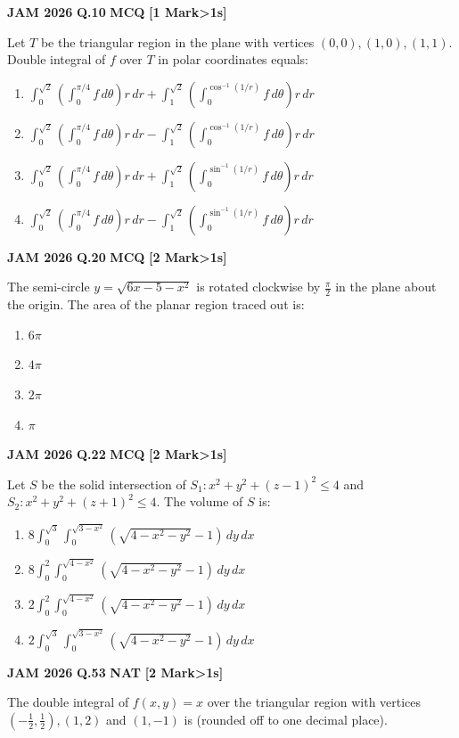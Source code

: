 \documentclass[11pt,a4paper]{article}
\newcommand{\pyqheader}[4]{%
    \noindent\begin{tcolorbox}[
        colback=badgebg,
        colframe=secondary,
        arc=2mm,
        boxrule=0.6pt,
        top=1.5mm,bottom=1.5mm,left=2mm,right=2mm
    ]
        \textbf{\textcolor{primary}{JAM #1}} \hfill \textbf{Q.#2} \hfill \textsc{\textbf{#3}} \hfill \textbf{[#4 Mark\ifnum#4>1s\fi]}
    \end{tcolorbox}\vspace{-1mm}
}
\begin{document}
\pyqheader{2026}{10}{MCQ}{1}
Let $T$ be the triangular region in the plane with vertices $(0,0), (1,0), (1,1)$. Double integral of $f$ over $T$ in polar coordinates equals:
\begin{enumerate}[label=(\Alph*)]
    \item $\int_{0}^{\sqrt{2}}\left(\int_{0}^{\pi/4}f\,d\theta\right)r\,dr + \int_{1}^{\sqrt{2}}\left(\int_{0}^{\cos^{-1}(1/r)}f\,d\theta\right)r\,dr$
    \item $\int_{0}^{\sqrt{2}}\left(\int_{0}^{\pi/4}f\,d\theta\right)r\,dr - \int_{1}^{\sqrt{2}}\left(\int_{0}^{\cos^{-1}(1/r)}f\,d\theta\right)r\,dr$
    \item $\int_{0}^{\sqrt{2}}\left(\int_{0}^{\pi/4}f\,d\theta\right)r\,dr + \int_{1}^{\sqrt{2}}\left(\int_{0}^{\sin^{-1}(1/r)}f\,d\theta\right)r\,dr$
    \item $\int_{0}^{\sqrt{2}}\left(\int_{0}^{\pi/4}f\,d\theta\right)r\,dr - \int_{1}^{\sqrt{2}}\left(\int_{0}^{\sin^{-1}(1/r)}f\,d\theta\right)r\,dr$
\end{enumerate}

\pyqheader{2026}{20}{MCQ}{2}
The semi-circle $y=\sqrt{6x-5-x^{2}}$ is rotated clockwise by $\frac{\pi}{2}$ in the plane about the origin. The area of the planar region traced out is:
\begin{enumerate}[label=(\Alph*)]
    \item $6\pi$
    \item $4\pi$
    \item $2\pi$
    \item $\pi$
\end{enumerate}

\pyqheader{2026}{22}{MCQ}{2}
Let $S$ be the solid intersection of $S_{1}: x^{2}+y^{2}+(z-1)^{2}\le 4$ and $S_{2}: x^{2}+y^{2}+(z+1)^{2}\le 4$. The volume of $S$ is:
\begin{enumerate}[label=(\Alph*)]
    \item $8\int_{0}^{\sqrt{3}}\int_{0}^{\sqrt{3-x^{2}}}(\sqrt{4-x^{2}-y^{2}}-1)\,dy\,dx$
    \item $8\int_{0}^{2}\int_{0}^{\sqrt{4-x^{2}}}(\sqrt{4-x^{2}-y^{2}}-1)\,dy\,dx$
    \item $2\int_{0}^{2}\int_{0}^{\sqrt{4-x^{2}}}(\sqrt{4-x^{2}-y^{2}}-1)\,dy\,dx$
    \item $2\int_{0}^{\sqrt{3}}\int_{0}^{\sqrt{3-x^{2}}}(\sqrt{4-x^{2}-y^{2}}-1)\,dy\,dx$
\end{enumerate}

\pyqheader{2026}{53}{NAT}{2}
The double integral of $f(x,y)=x$ over the triangular region with vertices $(-\frac{1}{2},\frac{1}{2}), (1,2)$ and $(1,-1)$ is \underline{\hspace{1.5cm}} (rounded off to one decimal place).
\end{document}
